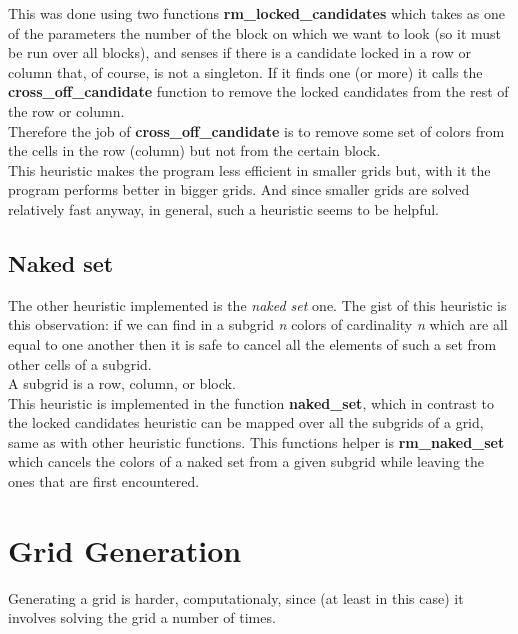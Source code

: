 \documentclass[english,a4paper]{article}
\begin{document}
This was done using two functions \textbf{rm\_locked\_candidates} which
takes as one of the parameters the number of the block on which we
want to look (so it must be run over all blocks), and senses if there
is a candidate locked in a row or column that, of course, is not a
singleton. If it finds one (or more) it calls the
\textbf{cross\_off\_candidate} function to remove the locked candidates
from the rest of the row or column.\\

Therefore the job of \textbf{cross\_off\_candidate} is to remove some
set of colors from the cells in the row (column) but not from the
certain block.\\

This heuristic makes the program less efficient in smaller grids but,
with it the program performs better in bigger grids. And since smaller
grids are solved relatively fast anyway, in general, such a heuristic
seems to be helpful. \\

\subsection{Naked set}

The other heuristic implemented is the \emph{naked set} one. The gist
of this heuristic is this observation: if we can find in a subgrid
\emph{n} colors of cardinality \emph{n} which are all equal to one
another then it is safe to cancel all the elements of such a set from
other cells of a subgrid.\\ 

A subgrid is a row, column, or block.\\

This heuristic is implemented in the function \textbf{naked\_set},
which in contrast to the locked candidates heuristic can be mapped
over all the subgrids of a grid, same as with other heuristic
functions. This functions helper is \textbf{rm\_naked\_set} which
cancels the colors of a naked set from a given subgrid while leaving
the ones that are first encountered.

\section{Grid Generation}

Generating a grid is harder, computationaly, since (at least in this
case) it involves solving the grid a number of times.\\
\end{document}
